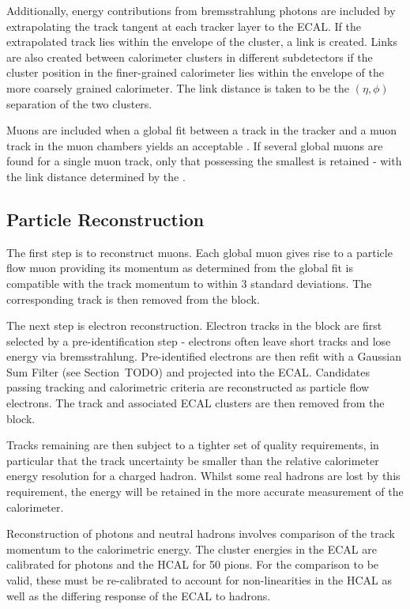 Additionally, energy contributions from bremsstrahlung photons are included by
extrapolating the track tangent at each tracker layer to the \ac{ECAL}. If the
extrapolated track lies within the envelope of the cluster, a link is created.
Links are also created between calorimeter clusters in different subdetectors if
the cluster position in the finer-grained calorimeter lies within the envelope
of the more coarsely grained calorimeter. The link distance is taken to be the
$(\eta, \phi)$ separation of the two clusters.

Muons are included when a global fit between a track in the tracker and a muon
track in the muon chambers yields an acceptable \chisq. If several global muons
are found for a single muon track, only that possessing the smallest \chisq is
retained - with the link distance determined by the \chisq.

\subsection{Particle Reconstruction}
The first step is to reconstruct muons. Each global muon gives rise to a
particle flow muon providing its momentum as determined from the global fit is
compatible with the track momentum to within 3 standard deviations. The
corresponding track is then removed from the block.

The next step is electron reconstruction. Electron tracks in the block are first
selected by a pre-identification step - electrons often leave short tracks and
lose energy via bremsstrahlung. Pre-identified electrons are then refit with a
Gaussian Sum Filter (see Section~TODO) and projected into the \ac{ECAL}.
Candidates passing tracking and calorimetric criteria are reconstructed as
particle flow electrons. The track and associated \ac{ECAL} clusters are then
removed from the block.

Tracks remaining are then subject to a tighter set of quality requirements, in
particular that the track \Pt uncertainty be smaller than the relative
calorimeter energy resolution for a charged hadron. Whilst some real hadrons are
lost by this requirement, the energy will be retained in the more accurate
measurement of the calorimeter.

Reconstruction of photons and neutral hadrons involves comparison of the track
momentum to the calorimetric energy. The cluster energies in the \ac{ECAL} are
calibrated for photons and the \ac{HCAL} for \unit{50}{\GeV} pions. For the
comparison to be valid, these must be re-calibrated to account for
non-linearities in the \ac{HCAL} as well as the differing response of the
\ac{ECAL} to hadrons.

